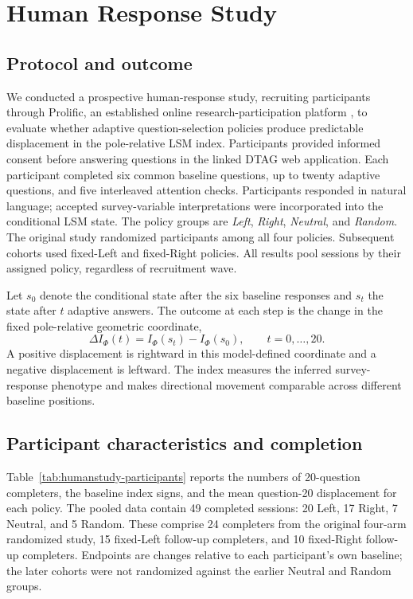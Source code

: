 
\section{Human Response Study}\label{sec:humanstudy}

\subsection{Protocol and outcome}
We conducted a prospective human-response study, recruiting participants
through Prolific, an established online research-participation platform
\cite{prolificEthics2026}, to evaluate whether adaptive question-selection
policies produce predictable displacement in the pole-relative LSM index.
Participants provided informed consent before answering questions in the
linked DTAG web application. Each participant completed six common
baseline questions, up to twenty adaptive questions, and five interleaved
attention checks. Participants responded in natural language; accepted
survey-variable interpretations were incorporated into the conditional
LSM state. The policy groups are \emph{Left}, \emph{Right},
\emph{Neutral}, and \emph{Random}. The original study randomized
participants among all four policies. Subsequent cohorts used fixed-Left
and fixed-Right policies. All results pool sessions by their assigned
policy, regardless of recruitment wave.

Let $s_0$ denote the conditional state after the six baseline responses
and $s_t$ the state after $t$ adaptive answers. The outcome at each
step is the change in the fixed pole-relative geometric coordinate,
\begin{equation}
\Delta I_\Phi(t)=I_\Phi(s_t)-I_\Phi(s_0),\qquad t=0,\ldots,20.
\label{eq:humanstudy-delta}
\end{equation}
A positive displacement is rightward in this model-defined coordinate
and a negative displacement is leftward. The index measures the inferred survey-response phenotype and makes
directional movement comparable across different baseline positions.

\subsection{Participant characteristics and completion}
Table~\ref{tab:humanstudy-participants} reports the numbers of
20-question completers, the baseline index signs, and the mean
question-20 displacement for each policy. The pooled data contain 49
completed sessions: 20 Left, 17 Right, 7 Neutral, and 5 Random.
These comprise 24 completers from the original four-arm randomized
study, 15 fixed-Left follow-up completers, and 10 fixed-Right
follow-up completers. Endpoints are changes relative to each
participant's own baseline; the later cohorts were not randomized
against the earlier Neutral and Random groups.

